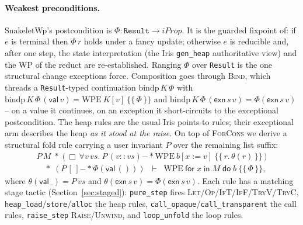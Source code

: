 \documentclass[sigconf,nonacm]{acmart}
\newcommand{\sepc}{\mathbin{\ast}}
\newcommand{\wand}{\mathrel{-\!\ast}}
\newcommand{\code}[1]{\texttt{#1}}
\newcommand{\wpe}[2]{\mathrm{WPE}\ #1\ \{\!\!\{\, #2 \,\}\!\!\}}
\newcommand{\rval}[1]{\mathsf{val}\,#1}
\newcommand{\rexn}[2]{\mathsf{exn}\,#1\,#2}
\newcommand{\subs}[3]{#1[#2{:=}#3]}
\begin{document}
\paragraph{Weakest preconditions.} SnakeletWp's postcondition is $\Phi :
\code{Result} \to \mathit{iProp}$. It is the guarded fixpoint of: if $e$ is
terminal then $\Phi\,r$ holds under a fancy update; otherwise $e$ is reducible and,
after one step, the state interpretation (the Iris \code{gen\_heap} authoritative
view) and the WP of the reduct are re-established. Ranging $\Phi$ over
\code{Result} is the one structural change exceptions force. Composition goes
through \textsc{Bind}, which threads a \code{Result}-typed continuation
$\mathrm{bindp}\,K\,\Phi$ with $\mathrm{bindp}\,K\,\Phi\,(\rval{v}) =
\wpe{K[v]}{\Phi}$ and $\mathrm{bindp}\,K\,\Phi\,(\rexn{s}{v}) = \Phi(\rexn{s}{v})$
-- on a value it continues, on an exception it short-circuits to the exceptional
postcondition. The heap rules are the usual Iris points-to rules; their
exceptional arm describes the heap \emph{as it stood at the raise}. On top of
\textsc{ForCons} we derive a structural fold rule carrying a user invariant $P$
over the remaining list suffix:
\[
\begin{array}{l}
P\,M \;\sepc\; \big(\,\Box\,\forall v\,\mathit{vs}.\ P\,(v\!::\!\mathit{vs}) \wand
  \wpe{\subs{b}{x}{v}}{r.\,\theta(r)}\,\big) \\[2pt]
\quad {}\sepc\; (P\,[\,] \wand \Phi(\rval{()})) \;\;\vdash\;\;
  \wpe{\mathsf{for}\;x\;\mathsf{in}\;M\;\mathsf{do}\;b}{\Phi},
\end{array}
\]
where $\theta(\rval{\_}) = P\,\mathit{vs}$ and $\theta(\rexn{s}{v}) =
\Phi(\rexn{s}{v})$. Each rule has a matching stage tactic
(Section~\ref{sec:staged}): \code{pure\_step} fires
\textsc{Let}\slash\textsc{Op}\slash\textsc{IfT}\slash\textsc{IfF}\slash\textsc{TryV}\slash\textsc{TryC},
\code{heap\_load}\slash\code{store}\slash\code{alloc} the heap rules,
\code{call\_opaque}\slash\code{call\_transparent} the call rules, \code{raise\_step}
\textsc{Raise}\slash\textsc{Unwind}, and \code{loop\_unfold} the loop rules.
\end{document}
